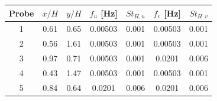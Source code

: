 \begin{tabular}{ccccccc}
\hline
Probe & $x/H$ & $y/H$ & $f_u$ [Hz] & $St_{H,u}$ & $f_v$ [Hz] & $St_{H,v}$ \\
\hline
1 & 0.61 & 0.65 & 0.00503 & 0.001 & 0.00503 & 0.001 \\
2 & 0.56 & 1.61 & 0.00503 & 0.001 & 0.00503 & 0.001 \\
3 & 0.97 & 0.71 & 0.00503 & 0.001 & 0.0201 & 0.006 \\
4 & 0.43 & 1.47 & 0.00503 & 0.001 & 0.00503 & 0.001 \\
5 & 0.84 & 0.64 & 0.0201 & 0.006 & 0.0201 & 0.006 \\
\hline
\end{tabular}
